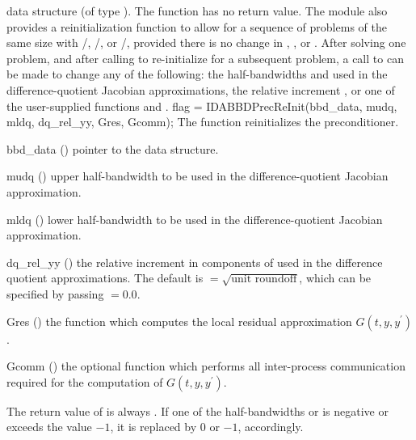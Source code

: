 {{  data structure (of type ).
}
{
  The function  has no return value.
}
{}
The {\idabbdpre} module also provides a reinitialization function to allow
for a sequence of problems of the same size with {\idaspgmr}/{\idabbdpre},
{\idaspbcg}/{\idabbdpre}, or {\idasptfqmr}/{\idabbdpre}, provided there is no
change in , , or .
After solving one problem, and after calling  to re-initialize 
{\ida} for a subsequent problem, a call to  can be made
to change any of the following: the half-bandwidths  and  
used in the difference-quotient Jacobian approximations, the relative increment 
, or one of the user-supplied functions  and .
{
  flag = IDABBDPrecReInit(bbd\_data, mudq, mldq, dq\_rel\_yy, Gres, Gcomm);
}
{
  The function  reinitializes the {\idabbdpre} preconditioner.
}
{
  \begin{args}[dq\_rel\_yy]
  \item[bbd\_data] ()
    pointer to the {\idabbdpre} data structure.
  \item[mudq] ()
    upper half-bandwidth to be used in the difference-quotient Jacobian approximation.
  \item[mldq] ()
    lower half-bandwidth to be used in the difference-quotient Jacobian approximation.
  \item[dq\_rel\_yy] ()
    the relative increment in components of  used in the difference quotient
    approximations.  
    The default is  $= \sqrt{\text{unit roundoff}}$, which
    can be specified by passing  $= 0.0$.
  \item[Gres] ()
    the {\C} function which computes the local residual approximation 
    $G(t,y,y^\prime)$.
  \item[Gcomm] ()
    the optional {\C} function which performs all inter-process communication
    required for the computation of $G(t,y,y^\prime)$.
  \end{args}
}
{
  The return value of  is always .
}
{
  If one of the half-bandwidths  or  is negative or
  exceeds the value $-1$, it is replaced by 0 or $-1$,
  accordingly.
}
}
